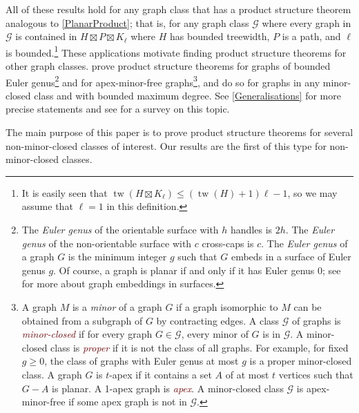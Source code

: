 \documentclass{patmorin}
\theoremstyle{plain}
\theoremstyle{definition}
\newcommand{\defin}[1]{\textcolor{Maroon}{\emph{#1}}}
\newcommand{\note}[2]{\noindent{\color{red}[#1:~#2]}}
\DeclareMathOperator{\tw}{tw}
\renewcommand{\geq}{\geqslant}
\renewcommand{\leq}{\leqslant}
\begin{document}


All of these results hold for any graph class that has a product structure theorem analogous to \cref{PlanarProduct}; that is, for any graph class  $\mathcal{G}$ where every graph in $\mathcal{G}$ is contained in $H\boxtimes P\boxtimes K_\ell$ where $H$ has bounded treewidth, $P$ is a path, and $\ell$ is bounded.\footnote{It is easily seen that $\tw(H\boxtimes K_\ell) \leq (\tw(H)+1)\ell-1$, so we may assume that $\ell=1$ in this definition.} These applications motivate finding product structure theorems for other graph classes. \citet{DJMMUW20} prove product structure theorems for graphs of bounded Euler genus\footnote{The \textit{Euler genus} of the orientable surface with $h$ handles is $2h$. The \textit{Euler genus} of the non-orientable surface with $c$ cross-caps is $c$. The \textit{Euler genus} of a graph $G$ is the minimum integer $g$ such that $G$ embeds in a surface of Euler genus $g$. Of course, a graph is planar if and only if it has Euler genus 0; see \citep{mohar.thomassen:graphs} for more about graph embeddings in surfaces.} and for apex-minor-free graphs\footnote{A graph $M$ is a \textit{minor} of a graph $G$ if a graph isomorphic to $M$ can be obtained from a subgraph of $G$ by contracting edges. A class $\mathcal{G}$ of graphs is \defin{minor-closed} if for every graph $G\in\mathcal{G}$, every minor of $G$ is in $\mathcal{G}$. A minor-closed class is \defin{proper} if it is not the class of all graphs. For example, for fixed $g\geq 0$, the class of graphs with Euler genus at most $g$ is a proper minor-closed class. A graph $G$ is $t$-apex if it contains a set $A$ of at most $t$ vertices such that $G-A$ is planar. A 1-apex graph is \defin{apex}.  A minor-closed class $\mathcal{G}$ is apex-minor-free if some apex graph is not in $\mathcal{G}$.}, and \citet{DEMWW22} do so for graphs in any minor-closed class and with bounded maximum degree. See \cref{Generalisations} for more precise statements and see \citep{DHJLW21} for a survey on this topic.

The main purpose of this paper is to prove product structure theorems for several non-minor-closed classes of interest. Our results are the first of this type for non-minor-closed classes.
\end{document}
